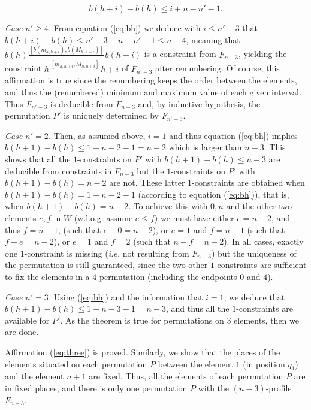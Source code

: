 \documentclass{article}
\begin{document}
\begin{equation}
b(h+i)-b(h)\leq i+n-n'-1.
\label{eq:bh}
\end{equation}

{\sl Case $n'\geq 4$.} From equation (\ref{eq:bh}) we deduce with $i\leq n'-3$ that $b(h+i)-b(h)\leq n'-3+n-n'-1\leq n-4$,
meaning that $b(h)\frac{\,\scriptstyle{[b(m_{h,h+i}),b(M_{h,h+i})]}\,}{}b(h+i)$ is
a constraint from $F_{n-3}$, yielding the constraint $h\frac{\,\scriptstyle{[m_{h,h+i},M_{h,h+i}]}\,}{}h+i$
of $F_{n'-3}$ after renumbering. Of course, this affirmation is true since the renumbering
keeps the order between the elements, and thus the (renumbered) minimum and maximum value of each
given interval. Thus $F_{n'-3}$ is deducible from $F_{n-3}$ and, by inductive hypothesis, the
permutation $P'$ is uniquely determined by $F_{n'-3}$.

{\sl Case $n'=2$.} Then, as assumed above, $i=1$ and thus  equation (\ref{eq:bh}) implies 
$b(h+1)-b(h)\leq 1+n-2-1=n-2$ which is larger than $n-3$. This shows that all the $1$-constraints
on $P'$ with $b(h+1)-b(h)\leq n-3$ are deducible from constraints in $F_{n-3}$ but the 
$1$-constraints on $P'$ with $b(h+1)-b(h)=n-2$ are not. These latter $1$-constraints 
are obtained when $b(h+1)-b(h)= 1+n-2-1$ (according to equation (\ref{eq:bh})), that is, when
$b(h+1)-b(h)= n-2$. To achieve this with $0, n$ and the other two elements $e,f$ in $W$ (w.l.o.g. assume
$e\leq f$) we must have either $e=n-2$, and thus $f=n-1$, (such that $e-0=n-2$), or $e=1$ and $f=n-1$ (such that
$f-e=n-2$), or $e=1$ and $f=2$ (such that $n-f=n-2$). In all cases, exactly one $1$-constraint is missing
({\em i.e.} not resulting from $F_{n-3}$) but the uniqueness of the permutation is still guaranteed,
since the two other $1$-constraints are sufficient to fix the elements in a $4$-permutation (including
the endpoints $0$ and $4$).

{\sl Case $n'=3$.} Using (\ref{eq:bh}) and the information that $i=1$, we deduce that 
$b(h+1)-b(h)\leq 1+n-3-1=n-3$, and thus all the $1$-constraints are available for $P'$.
As the theorem is true for permutations on $3$ elements, then we are done.

Affirmation (\ref{eq:three}) is proved.
Similarly, we show that the places of the elements situated on each permutation $P$ between the element $1$
(in position $q_1$) and the element $n+1$ are fixed. Thus, all the elements of each permutation $P$ are  in
fixed places, and there is only one permutation $P$ with the $(n-3)$-profile $F_{n-3}$.  
\medskip
\end{document}
